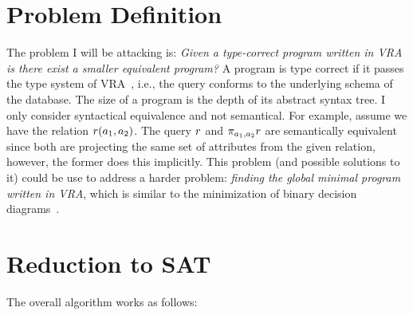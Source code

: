 \documentclass[12pt]{article}
\begin{document}
 

\section{Problem Definition}
\label{sec:def}

The problem I will be attacking is:
\emph{Given a type-correct program written in VRA 
 is there exist a smaller equivalent program?}
A program is type correct if it passes the type system of VRA~\cite{vldbArXiv},
i.e., the query conforms to the underlying schema of the database.
The size of a program is the depth of its abstract syntax tree. 
I only consider syntactical equivalence and not semantical. 
For example, assume we have the relation $\vRel (\att_1, \att_2)$.
The query $\vRel$ and $\pi_{\att_1, \att_2} \vRel$ are semantically
equivalent since both are projecting the same set of attributes from the
given relation, however, the former does this implicitly. 
This problem (and possible solutions to it) could be use to address
a harder problem: \emph{finding the global minimal program written in VRA}, 
which is similar to the minimization of binary decision diagrams~\cite{minBDD}.




\section{Reduction to SAT}
\label{sec:reduce}

The overall algorithm works as follows:
\end{document}
